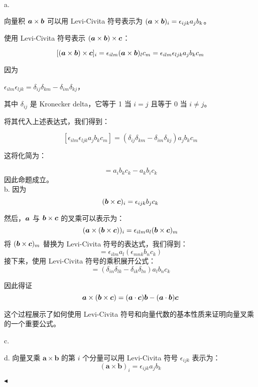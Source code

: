 \documentclass[11pt]{article}
\newenvironment{question}[2][Question]{\begin{trivlist}
\item[\hskip \labelsep {\bfseries #1}\hskip \labelsep {\bfseries #2.}]}{\hfill$\blacktriangleleft$\end{trivlist}}
\begin{document}
    \begin{question}{6 (18') (矢量恒等式证明)}~

    a. 
    
    向量积 \(\vb*{a} \times \vb*{b}\) 可以用 Levi-Civita 符号表示为 \((\vb*{a} \times \vb*{b})_i = \epsilon_{ijk} a_j b_k\)。
    
    
    使用 Levi-Civita 符号表示 \((\vb*{a} \times \vb*{b}) \times \vb*{c}\)：
    
    \[[(\vb*{a} \times \vb*{b}) \times \vb*{c}]_i = \epsilon_{ilm} (\vb*{a} \times \vb*{b})_l c_m = \epsilon_{ilm} \epsilon_{ljk} a_j b_k c_m\]
    
    因为
    
    \(\epsilon_{ilm} \epsilon_{ljk} = \delta_{ij}\delta_{km} - \delta_{im}\delta_{kj}\)，
    
    其中 \(\delta_{ij}\) 是 Kronecker delta，它等于 1 当 \(i = j\) 且等于 0 当 \(i \neq j\)。
    
    将其代入上述表达式，我们得到：
    
    \[[\epsilon_{ilm} \epsilon_{ljk} a_j b_k c_m] = (\delta_{ij}\delta_{km} - \delta_{im}\delta_{kj}) a_j b_k c_m\]
    
    这将化简为：
    
    \[= a_i b_k c_k - a_k b_i c_k \] 因此命题成立。\\

    b. 因为
    \[(\vb*{b} \times \vb*{c})_i = \epsilon_{ijk} b_j c_k\]
    
    然后，\(\vb*{a}\) 与 \(\vb*{b} \times \vb*{c}\) 的叉乘可以表示为：
    \[(\vb*{a} \times (\vb*{b} \times \vb*{c}))_i = \epsilon_{ilm} a_l (\vb*{b} \times \vb*{c})_m\]
    将 \((\vb*{b} \times \vb*{c})_m\) 替换为 Levi-Civita 符号的表达式，我们得到：
    \[= \epsilon_{ilm} a_l (\epsilon_{mnk} b_n c_k)\]
    接下来，使用 Levi-Civita 符号的乘积展开公式：
    \[= (\delta_{in}\delta_{lk} - \delta_{ik}\delta_{ln}) a_l b_n c_k\]
    
    因此得证
    \[\vb*{a} \times (\vb*{b} \times \vb*{c}) = (\vb*{a} \cdot \vb*{c})\vb*{b} - (\vb*{a} \cdot \vb*{b})\vb*{c}\]
    
    这个过程展示了如何使用 Levi-Civita 符号和向量代数的基本性质来证明向量叉乘的一个重要公式。

    c. 

    d. 
    向量叉乘 \(\mathbf{a} \times \mathbf{b}\) 的第 \(i\) 个分量可以用 Levi-Civita 符号 \(\epsilon_{ijk}\) 表示为：
    \[
    (\mathbf{a} \times \mathbf{b})_i = \epsilon_{ijk}a_jb_k
    \]
    

\end{question}
\end{document}
